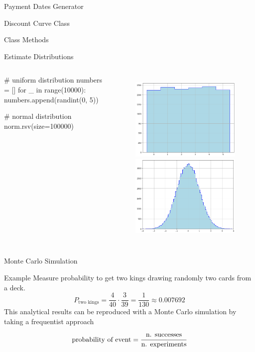 \documentclass{beamer}
\begin{document}
\begin{frame}[fragile]{Payment Dates Generator}
\begin{itemize}
\begin{frame}{Discount Curve Class}
\begin{frame}{Class Methods}
\begin{itemize}
\begin{iptyhon}
\begin{frame}[fragile]{Estimate Distributions}
\begin{columns}
\begin{ipython}
# uniform distribution
numbers = []
for _ in range(10000):
    numbers.append(randint(0, 5))

# normal distribution
norm.rsv(size=100000)   
\end{ipython}
\begin{figure}[h]
    \begin{center}
    \includegraphics[width=0.55\linewidth]{uniform_distro}\\
    \includegraphics[width=0.55\linewidth]{gauss_distro}
    \end{center}
\end{figure}    
\end{columns}
\end{frame}

\begin{frame}{Monte Carlo Simulation}
\begin{block}{Example}
Measure probability to get two kings drawing randomly two cards from a deck.
\begin{equation*}
P_{\textrm{two kings}} = \frac{4}{40} \cdot \frac{3}{39} = \frac{1}{130} \approx 0.007692
\end{equation*}
This analytical results can be reproduced with a Monte Carlo simulation by taking a frequentist approach
\begin{equation*}
\textrm{probability of event} = \cfrac{\textrm{n. successes}}{\textrm{n. experiments}}
\end{equation*}
\end{block}
\end{frame}


\end{iptyhon}
\end{itemize}
\end{frame}
\end{frame}
\end{itemize}
\end{frame}
\end{document}
